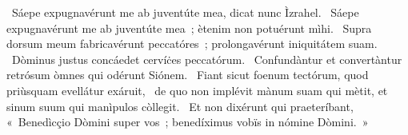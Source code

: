 ~Sáepe expugnavérunt me ab juventúte mea, dicat nunc Ìzrahel. 
~Sáepe expugnavérunt me ab juventúte mea~; ètenim non potuérunt mìhi. 
~Supra dorsum meum fabricavérunt peccatóres~; prolongavérunt iniquitátem suam. 
~Dòminus justus concáedet cervíċes peccatórum. 
~Confundàntur et convertàntur retrósum òmnes qui odérunt Siónem. 
~Fiant sicut foenum tectórum, quod priùsquam evellátur exáruit, 
~de quo non implévit mànum suam qui mètit, et sinum suum qui manìpulos còllegit. 
~Et non dixérunt qui praeteríbant, «~Benedìcçio Dòmini super vos~; benedíximus vobïs in nómine Dòmini.~»
